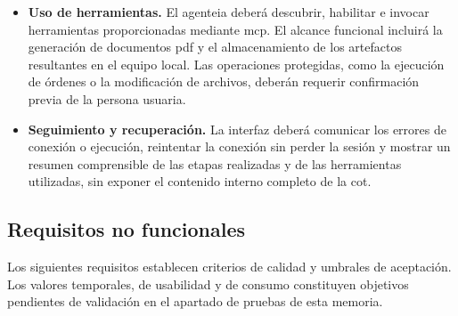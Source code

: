 \begin{itemize}
    \item[\textbf{RF9.}] \textbf{Uso de herramientas.} El \gls{agenteia} deberá descubrir, habilitar e invocar herramientas proporcionadas mediante \gls{mcp}. El alcance funcional incluirá la generación de documentos \gls{pdf} y el almacenamiento de los artefactos resultantes en el equipo local. Las operaciones protegidas, como la ejecución de órdenes o la modificación de archivos, deberán requerir confirmación previa de la persona usuaria.
    \item[\textbf{RF10.}] \textbf{Seguimiento y recuperación.} La interfaz deberá comunicar los errores de conexión o ejecución, reintentar la conexión sin perder la sesión y mostrar un resumen comprensible de las etapas realizadas y de las herramientas utilizadas, sin exponer el contenido interno completo de la \gls{cot}.
\end{itemize}

\subsection{Requisitos no funcionales}

Los siguientes requisitos establecen criterios de calidad y umbrales de aceptación. Los valores temporales, de usabilidad y de consumo constituyen objetivos pendientes de validación en el apartado de pruebas de esta memoria.

